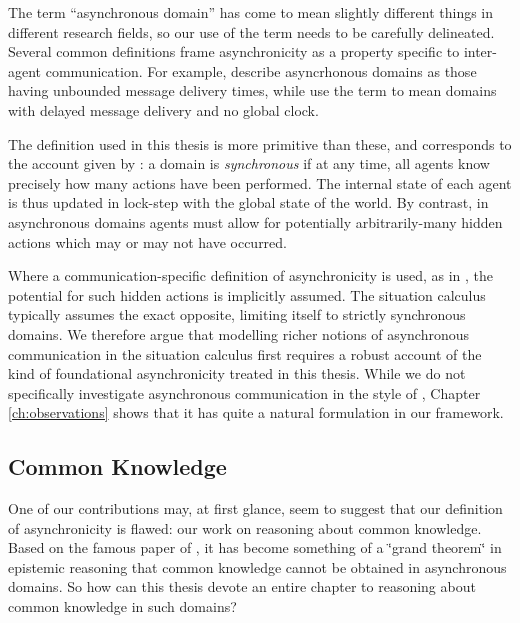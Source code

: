 The term {}``asynchronous domain'' has come to mean slightly different
things in different research fields, so our use of the term needs
to be carefully delineated. Several common definitions frame asynchronicity
as a property specific to inter-agent communication. For example,
\citet{fischer85distributed_consensus} describe asyncrhonous domains
as those having unbounded message delivery times, while \citet{halpern90knowledge_distrib}
use the term to mean domains with delayed message delivery and no
global clock.

The definition used in this thesis is more primitive than these, and
corresponds to the account given by \citet{vanBentham06tree_of_knowledge}:
a domain is \emph{synchronous} if at any time, all agents know precisely
how many actions have been performed. The internal state of each agent
is thus updated in lock-step with the global state of the world. By
contrast, in asynchronous domains agents must allow for potentially
arbitrarily-many hidden actions which may or may not have occurred.

Where a communication-specific definition of asynchronicity is used,
as in \citep{fischer85distributed_consensus,halpern90knowledge_distrib},
the potential for such hidden actions is implicitly assumed. The situation
calculus typically assumes the exact opposite, limiting itself to
strictly synchronous domains. We therefore argue that modelling richer
notions of asynchronous communication in the situation calculus first
requires a robust account of the kind of foundational asynchronicity
treated in this thesis. While we do not specifically investigate asynchronous
communication in the style of \citep{fischer85distributed_consensus,halpern90knowledge_distrib},
Chapter \ref{ch:observations} shows that it has quite a natural formulation
in our framework.


\subsection{Common Knowledge}

One of our contributions may, at first glance, seem to suggest that
our definition of asynchronicity is flawed: our work on reasoning
about common knowledge. Based on the famous paper of \citet{halpern90knowledge_distrib},
it has become something of a \char`\"{}grand theorem\char`\"{} in
epistemic reasoning that common knowledge cannot be obtained in asynchronous
domains. So how can this thesis devote an entire chapter to reasoning
about common knowledge in such domains?

